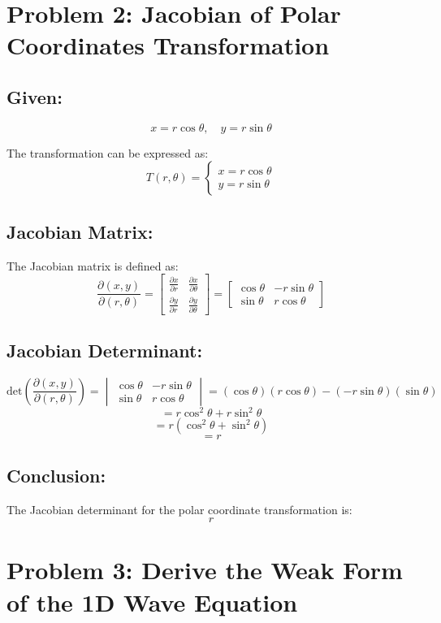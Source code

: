 \documentclass[11pt]{article}
\begin{document}
\section*{Problem 2: Jacobian of Polar Coordinates Transformation}

\subsection*{Given:}
\[
x = r \cos \theta, \quad y = r \sin \theta
\]

The transformation can be expressed as:
\[
T(r, \theta) =
\begin{cases}
x = r \cos \theta \\
y = r \sin \theta
\end{cases}
\]

\subsection*{Jacobian Matrix:}
The Jacobian matrix is defined as:
\[
\frac{\partial(x, y)}{\partial(r, \theta)} =
\begin{bmatrix}
\frac{\partial x}{\partial r} & \frac{\partial x}{\partial \theta} \\
\frac{\partial y}{\partial r} & \frac{\partial y}{\partial \theta}
\end{bmatrix}
=
\begin{bmatrix}
\cos \theta & -r \sin \theta \\
\sin \theta & r \cos \theta
\end{bmatrix}
\]

\subsection*{Jacobian Determinant:}
\[
\text{det}\left( \frac{\partial(x, y)}{\partial(r, \theta)} \right) =
\begin{vmatrix}
\cos \theta & -r \sin \theta \\
\sin \theta & r \cos \theta
\end{vmatrix}
= (\cos \theta)(r \cos \theta) - (-r \sin \theta)(\sin \theta)
\]
\[
= r \cos^2 \theta + r \sin^2 \theta
\]
\[
= r(\cos^2 \theta + \sin^2 \theta)
\]
\[
= r
\]

\subsection*{Conclusion:}
The Jacobian determinant for the polar coordinate transformation is:
\[
\boxed{r}
\]
\section*{Problem 3: Derive the Weak Form of the 1D Wave Equation}
\end{document}

